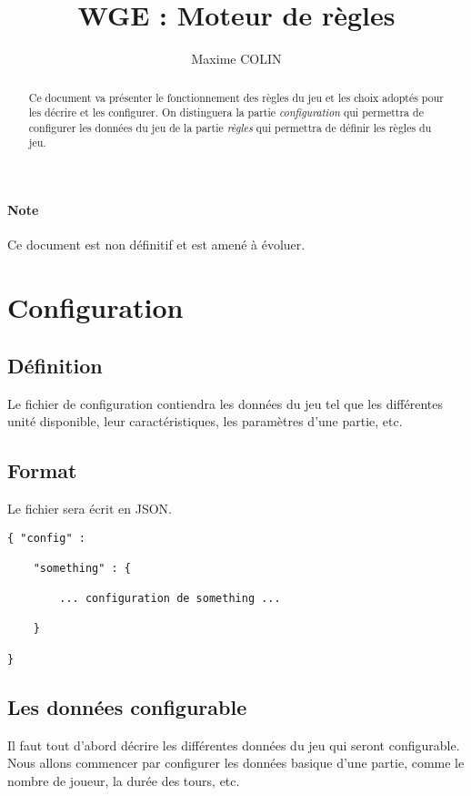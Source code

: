 \documentclass[10pt,a4paper]{article}
\author{Maxime COLIN}
\title{WGE : Moteur de règles}
\begin{document}
\maketitle

\begin{abstract}
Ce document va présenter le fonctionnement des règles du jeu et les choix adoptés pour les décrire et les configurer. On distinguera la partie \textit{configuration} qui permettra de configurer les données du jeu de la partie \textit{règles} qui permettra de définir les règles du jeu.
\end{abstract}

\paragraph{Note} Ce document est non définitif et est amené à évoluer.

\section{Configuration}

\subsection{Définition}

Le fichier de configuration contiendra les données du jeu tel que les différentes unité disponible, leur caractéristiques, les paramètres d'une partie, etc.

\subsection{Format}

Le fichier sera écrit en JSON. 

\begin{verbatim}
{ "config" :

	"something" : {
	
		... configuration de something ...	
	
	}
	
}
\end{verbatim}


\subsection{Les données configurable}

Il faut tout d'abord décrire les différentes données du jeu qui seront configurable. Nous allons commencer par configurer les données basique d'une partie, comme le nombre de joueur, la durée des tours, etc.
\end{document}
